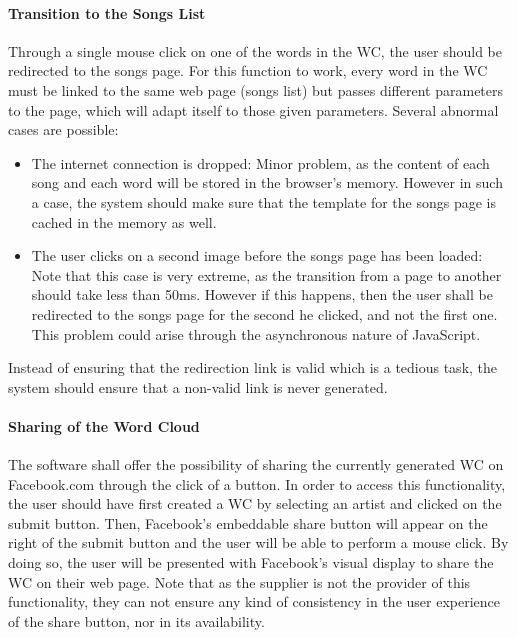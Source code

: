 \documentclass[]{article}
\begin{document}
\paragraph{Transition to the Songs
List}\label{transition-to-the-songs-list}

Through a single mouse click on one of the words in the WC, the user
should be redirected to the songs page. For this function to work, every
word in the WC must be linked to the same web page (songs list) but
passes different parameters to the page, which will adapt itself to
those given parameters. Several abnormal cases are possible:

\begin{itemize}
\itemsep1pt\parskip0pt
\item
  The internet connection is dropped: Minor problem, as the content of
  each song and each word will be stored in the browser's memory.
  However in such a case, the system should make sure that the template
  for the songs page is cached in the memory as well.
\item
  The user clicks on a second image before the songs page has been
  loaded: Note that this case is very extreme, as the transition from a
  page to another should take less than 50ms. However if this happens,
  then the user shall be redirected to the songs page for the second he
  clicked, and not the first one. This problem could arise through the
  asynchronous nature of JavaScript.
\end{itemize}

Instead of ensuring that the redirection link is valid which is a
tedious task, the system should ensure that a non-valid link is never
generated.

\paragraph{Sharing of the Word Cloud}\label{sharing-of-the-word-cloud}

The software shall offer the possibility of sharing the currently
generated WC on Facebook.com through the click of a button. In order to
access this functionality, the user should have first created a WC by
selecting an artist and clicked on the submit button. Then, Facebook's
embeddable share button will appear on the right of the submit button
and the user will be able to perform a mouse click. By doing so, the
user will be presented with Facebook's visual display to share the WC on
their web page. Note that as the supplier is not the provider of this
functionality, they can not ensure any kind of consistency in the user
experience of the share button, nor in its availability.
\end{document}
